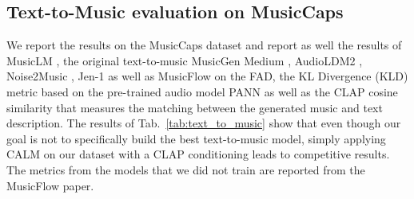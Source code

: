 \subsection{Text-to-Music evaluation on MusicCaps}
\label{sec:text-to-music}
We report the results on the MusicCaps dataset \cite{musiclm} and report as well the results of MusicLM \citep{musiclm}, the original text-to-music MusicGen Medium \citep{musicgen}, AudioLDM2 \citep{audioldm2}, Noise2Music \citep{noise2music}, Jen-1 \citep{jen1} as well as MusicFlow \citep{musicflow} on the FAD, the KL Divergence (KLD) metric based on the pre-trained audio model PANN \citep{pann} as well as the CLAP cosine similarity that measures the matching between the generated music and text description. The results of Tab.~\ref{tab:text_to_music} show that even though our goal is not to specifically build the best text-to-music model, simply applying CALM on our dataset with a CLAP conditioning leads to competitive results. The metrics from the models that we did not train are reported from the MusicFlow \citep{musicflow} paper.


